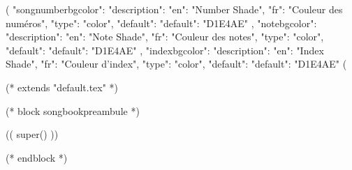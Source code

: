 (%
{
"songnumberbgcolor": {"description": {"en": "Number Shade", "fr": "Couleur des numéros"},
                     "type": "color",
                     "default": {"default": "D1E4AE"}
                  },
"notebgcolor": {"description": {"en": "Note Shade", "fr": "Couleur des notes"},
               "type": "color",
               "default": {"default": "D1E4AE"}
            },
"indexbgcolor": {"description": {"en": "Index Shade", "fr": "Couleur d'index"},
               "type": "color",
               "default": {"default": "D1E4AE"}
            }
}
(%

(* extends "default.tex" *)

(* block songbookpreambule *)
   \usepackage[
     a4paper %
     ,includeheadfoot %
     ,hmarginratio=1:1 %
     ,outer=1.8cm %
     ,vmarginratio=1:1 %
     ,bmargin=1.3cm %
     ]{geometry}

  (( super() ))

   \pagestyle{empty}


   \renewcommand{\snumbgcolor}{SongNumberBgColor}
   \renewcommand{\notebgcolor}{NoteBgColor}
   \renewcommand{\idxbgcolor}{IndexBgColor}
(* endblock *)
